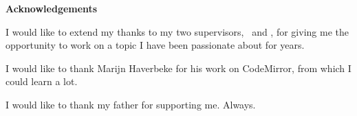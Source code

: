 \noindent \textbf{Acknowledgements}
\thispagestyle{empty}
\vspace*{1cm}

\noindent I would like to extend my thanks to my two supervisors, \firstsupervisor \ and \secondsupervisor, for giving me the opportunity to work on a topic I have been passionate about for years.


\vspace*{1cm}
\noindent I would like to thank Marijn Haverbeke for his work on CodeMirror, from which I could learn a lot.

\vspace*{1cm}
\noindent I would like to thank my father for supporting me. Always.